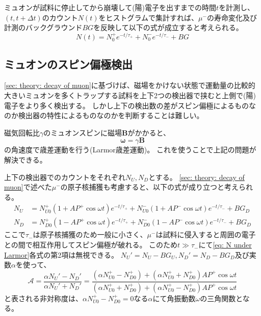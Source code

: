 \documentclass[dvipdfmx]{jsarticle}
\begin{document}

ミュオンが試料に停止してから崩壊して(陽)電子を出すまでの時間$t$を計測し、$(t,t+\Delta t)$のカウント$N(t)$をヒストグラムで集計すれば、$\mu^-$の寿命変化及び計測のバックグラウンド$BG$を反映して以下の式が成立すると考えられる。
\begin{equation}
    \label{eq: N of t considering different tau and BG}
    N(t)
    =
    N_0^+e^{-t/\tau_+}
    +
    N_0^-e^{-t/\tau_-}
    +
    BG
\end{equation}


\subsection{ミュオンのスピン偏極検出}

\ref{sec: theory: decay of muon}に基づけば、磁場をかけない状態で運動量の比較的大きいミュオンを多くトラップする試料を上下2つの検出器で挟むと上側で(陽)電子をより多く検出する。
しかし上下の検出数の差がスピン偏極によるものなのか検出器の特性によるものなのかを判断することは難しい。

磁気回転比$\gamma$のミュオンスピンに磁場$\bm{B}$がかかると、
\begin{equation}
    \label{eq: Larmor precession}
    \bm{\omega}=\gamma\bm{B}
\end{equation}
の角速度で歳差運動を行う(Larmor歳差運動)。
これを使うことで上記の問題が解決できる。

上下の検出器でのカウントをそれぞれ$N_U, N_D$とする。
\ref{sec: theory: decay of muon}で述べた$\mu^-$の原子核捕獲も考慮すると、以下の式が成り立つと考えられる。
\begin{equation}
    \label{eq: N under Larmor}
    \begin{split}
        N_U
        &=
        N_{U0}^+(1+AP^+\cos\omega t)e^{-t/\tau_+}
        +
        N_{U0}^-(1+AP^-\cos\omega t)e^{-t/\tau_-}
        +
        BG_D
        \\
        N_D
        &=
        N_{D0}^+(1-AP^+\cos\omega t)e^{-t/\tau_+}
        +
        N_{D0}^-(1-AP^-\cos\omega t)e^{-t/\tau_-}
        +
        BG_D
    \end{split}
\end{equation}
ここで$\tau_-$は原子核捕獲のため一般に小さく、$\mu^-$は試料に侵入すると周囲の電子との間で相互作用してスピン偏極が破れる。
このため$t\gg\tau_-$にて\eqref{eq: N under Larmor}各式の第2項は無視できる。
$N_U'=N_U-BG_U, N_D'=N_D-BG_D$及び実数$\alpha$を使って、
\begin{equation}
    \label{eq: asymmetry}
    \mathscr{A}
    =
    \frac{\alpha N_U'-N_D'}{\alpha N_U'+N_D'}
    =
    \frac{(\alpha N_{U0}^+-N_{D0}^+)+(\alpha N_{U0}^++N_{D0}^+)AP^+\cos\omega t}{(\alpha N_{U0}^++N_{D0}^+)+(\alpha N_{U0}^+-N_{D0}^+)AP^+\cos\omega t}
\end{equation}
と表される非対称度は、$\alpha N_{U0}^+-N_{D0}^+=0$なる$\alpha$にて角振動数$\omega$の三角関数となる。
\end{document}
